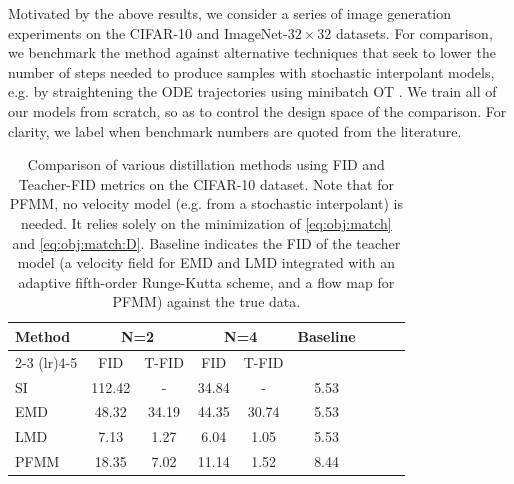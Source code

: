 Motivated by the above results, we consider a series of image generation experiments on the CIFAR-10 and ImageNet-$32\times32$ datasets.
%
For comparison, we benchmark the method against alternative techniques that seek to lower the number of steps needed to produce samples with stochastic interpolant models, e.g. by straightening the ODE trajectories using minibatch OT \citep{pooladian2023multisample, tong_improving_2023}.
%
We train all of our models from scratch, so as to control the design space of the comparison.
%
For clarity, we label when benchmark numbers are quoted from the literature.
\begin{table}[t!]
	\centering
	\begin{tabular}{lcccccccc}
		\toprule
		\multirow{2}{*}{Method} & \multicolumn{2}{c}{N=2} & \multicolumn{2}{c}{N=4} & \multirow{2}{*}{Baseline}                \\
		\cmidrule(lr){2-3} \cmidrule(lr){4-5}
		                        & FID                     & T-FID                   & FID                       & T-FID &      \\
		\midrule
		SI                      & 112.42                  & -                       & 34.84                     & -     & 5.53 \\
		EMD                     & 48.32                   & 34.19                   & 44.35                     & 30.74 & 5.53 \\
		LMD                     & 7.13                    & 1.27                    & 6.04                      & 1.05  & 5.53 \\
		PFMM                    & 18.35                   & 7.02                    & 11.14                     & 1.52  & 8.44 \\
		\bottomrule
	\end{tabular}
	\caption{Comparison of various distillation methods using FID and Teacher-FID metrics on the CIFAR-10 dataset. Note that for PFMM, no velocity model (e.g. from a stochastic interpolant) is needed. It relies solely on the minimization of \eqref{eq:obj:match} and \eqref{eq:obj:match:D}.
		Baseline indicates the FID of the teacher model (a velocity field for EMD and LMD integrated with
		an adaptive fifth-order Runge-Kutta scheme, and a flow map for PFMM) against the true data.
	}
	\label{tab:comparison}
\end{table}

